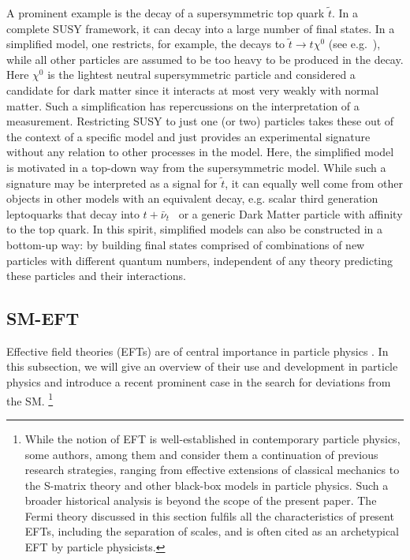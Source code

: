 A prominent example is the decay of a supersymmetric top quark
$\tilde{t}$. In a complete SUSY framework, it can decay into a large
number of final states.  In a simplified model, one restricts, for example, the
decays to $\tilde{t}\rightarrow t\chi^0$ (see e.g.~\cite{Aaboud:2017ayj}), while all other particles
are assumed to be too heavy to be produced in the decay.  
Here $\chi^0$ is the lightest neutral supersymmetric particle and considered a candidate for 
dark matter since it interacts at most very weakly with normal matter.  
Such a
simplification has repercussions on the interpretation of a
measurement.  Restricting SUSY to just one (or two) particles takes
these out of the context of a specific model and just provides an
experimental signature without any relation to other processes in the
model. Here, the simplified model is motivated in a top-down way from
the supersymmetric model. While such a signature may be interpreted as a signal for
$\tilde{t}$, it can equally well come from other objects in other
models with an equivalent decay, e.g. scalar third generation
leptoquarks that decay into $t+\bar{\nu}_t$~\citep{Aad:2015caa} or a generic Dark Matter particle with affinity to the
top quark. In this spirit, simplified models can also be constructed
in a bottom-up way: by building final states comprised of
combinations of new particles with different quantum numbers,
independent of any theory predicting these particles and their interactions.



\subsection{SM-EFT}

Effective field theories (EFTs) are of central importance in particle
physics \citep[see, e.g.,][]{Georgi:1994qn}. 
In this subsection, we will give an overview of their use and development in particle physics and introduce a recent prominent case in the search for deviations from the SM.
\footnote{While the notion of EFT is well-established in contemporary particle physics, some authors, among them \citet{wells2012} and \citet{Rivat2020-RIVPFO} consider them a continuation of previous research strategies, ranging from effective extensions of classical mechanics to the S-matrix theory and other black-box models in particle physics. Such a broader historical analysis is beyond the scope of the present paper. The Fermi theory discussed in this section fulfils all the characteristics of present EFTs, including the separation of scales, and is often cited as an archetypical EFT by particle physicists.}



